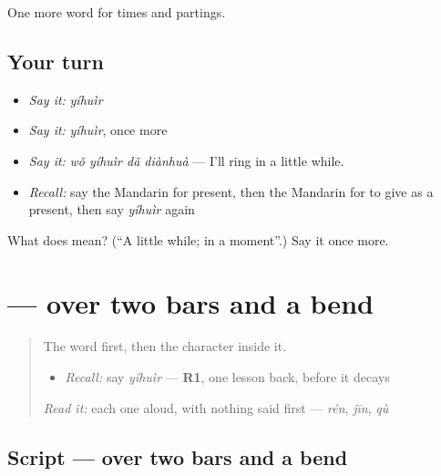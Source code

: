 \begin{grammarlens}[title={What you've built}]
One more word for times and partings.
\end{grammarlens}

\subsection*{Your turn}
\begin{itemize}
\raggedright
  \item \emph{Say it:} \emph{yíhuìr}
  \item \emph{Say it:} \emph{yíhuìr}, once more
  \item \emph{Say it:} \emph{wǒ yíhuìr dǎ diànhuà} — I'll ring in a little while.
  \item \emph{Recall:} say the Mandarin for present, then the Mandarin for to give as a present, then say \emph{yíhuìr} again
\end{itemize}

\begin{tcolorbox}[breakable,colback=teal!4,colframe=teal!35!black,title={Before you move on}]
What does  mean? (\textquotedblleft{}A little while; in a moment\textquotedblright{}.) Say it once more.
\end{tcolorbox}
\section[\texorpdfstring{\zh{会} (huì)}{会 (huì)}]{ —  over two bars and a bend}

\label{lesson:ZH-W76-hui}



\begin{quote}
The word first, then the character inside it.

\begin{itemize}
\raggedright
  \item \emph{Recall:} say \emph{yíhuìr} — \textbf{R1}, one lesson back, before it decays
\end{itemize}

\begin{quote}
  
\end{quote}

\emph{Read it:} each one aloud, with nothing said first — \emph{rén}, \emph{jīn}, \emph{qù}
\end{quote}

\subsection*{Script —  over two bars and a bend}

